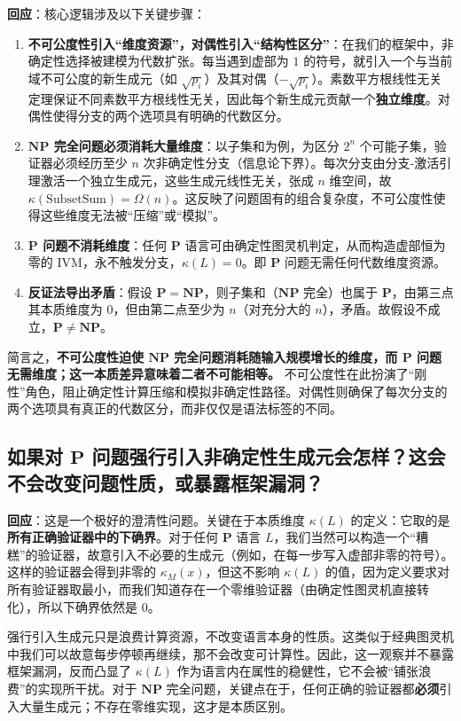 \documentclass{ctexart}
\begin{document}
	\textbf{回应}：核心逻辑涉及以下关键步骤：
	\begin{enumerate}
		\item \textbf{不可公度性引入``维度资源''，对偶性引入``结构性区分''}：在我们的框架中，非确定性选择被建模为代数扩张。每当遇到虚部为 $1$ 的符号，就引入一个与当前域不可公度的新生成元（如 $\sqrt{p_i}$）及其对偶（$-\sqrt{p_i}$）。素数平方根线性无关定理保证不同素数平方根线性无关，因此每个新生成元贡献一个\textbf{独立维度}。对偶性使得分支的两个选项具有明确的代数区分。
		\item \textbf{$\mathbf{NP}$ 完全问题必须消耗大量维度}：以子集和为例，为区分 $2^n$ 个可能子集，验证器必须经历至少 $n$ 次非确定性分支（信息论下界）。每次分支由分支-激活引理激活一个独立生成元，这些生成元线性无关，张成 $n$ 维空间，故 $\kappa(\text{SubsetSum}) = \Omega(n)$。这反映了问题固有的组合复杂度，不可公度性使得这些维度无法被``压缩''或``模拟''。
		\item \textbf{$\mathbf{P}$ 问题不消耗维度}：任何 $\mathbf{P}$ 语言可由确定性图灵机判定，从而构造虚部恒为零的 $\mathrm{IVM}$，永不触发分支，$\kappa(L) = 0$。即 $\mathbf{P}$ 问题无需任何代数维度资源。
		\item \textbf{反证法导出矛盾}：假设 $\mathbf{P} = \mathbf{NP}$，则子集和（$\mathbf{NP}$ 完全）也属于 $\mathbf{P}$，由第三点其本质维度为 $0$，但由第二点至少为 $n$（对充分大的 $n$），矛盾。故假设不成立，$\mathbf{P} \neq \mathbf{NP}$。
	\end{enumerate}
	简言之，\textbf{不可公度性迫使 $\mathbf{NP}$ 完全问题消耗随输入规模增长的维度，而 $\mathbf{P}$ 问题无需维度；这一本质差异意味着二者不可能相等。} 不可公度性在此扮演了``刚性''角色，阻止确定性计算压缩和模拟非确定性路径。对偶性则确保了每次分支的两个选项具有真正的代数区分，而非仅仅是语法标签的不同。
	
	
	\subsection{如果对 $\mathbf{P}$ 问题强行引入非确定性生成元会怎样？这会不会改变问题性质，或暴露框架漏洞？}
	
	\textbf{回应}：这是一个极好的澄清性问题。关键在于本质维度 $\kappa(L)$ 的定义：它取的是\textbf{所有正确验证器中的下确界}。对于任何 $\mathbf{P}$ 语言 $L$，我们当然可以构造一个``糟糕''的验证器，故意引入不必要的生成元（例如，在每一步写入虚部非零的符号）。这样的验证器会得到非零的 $\kappa_M(x)$，但这不影响 $\kappa(L)$ 的值，因为定义要求对所有验证器取最小，而我们知道存在一个零维验证器（由确定性图灵机直接转化），所以下确界依然是 $0$。
	
	强行引入生成元只是浪费计算资源，不改变语言本身的性质。这类似于经典图灵机中我们可以故意每步停顿再继续，那不会改变可计算性。因此，这一观察并不暴露框架漏洞，反而凸显了 $\kappa(L)$ 作为语言内在属性的稳健性，它不会被``铺张浪费''的实现所干扰。对于 $\mathbf{NP}$ 完全问题，关键点在于，任何正确的验证器都\textbf{必须}引入大量生成元；不存在零维实现，这才是本质区别。
	
\end{document}

